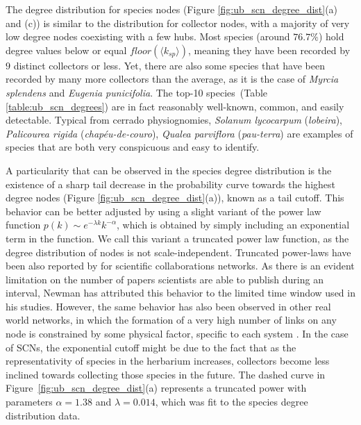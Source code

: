 The degree distribution for species nodes (Figure \ref{fig:ub_scn_degree_dist}(a) and (c)) is similar to the distribution for collector nodes, with a majority of very low degree nodes coexisting with a few hubs.
Most species (around $76.7\%$) hold degree values below or equal $floor(\langle k_{sp}\rangle)$, meaning they have been recorded by $9$ distinct collectors or less.
Yet, there are also some species that have been recorded by many more collectors than the average, as it is the case of \textit{Myrcia splendens} and \textit{Eugenia punicifolia}. The top-10 species~(Table \ref{table:ub_scn_degrees}) are in fact reasonably well-known, common, and easily detectable. Typical from cerrado physiognomies, \textit{Solanum lycocarpum} (\textit{lobeira}), \textit{Palicourea rigida} (\textit{chapéu-de-couro}), \textit{Qualea parviflora} (\textit{pau-terra}) are examples of species that are both very conspicuous and easy to identify.


A particularity that can be observed in the species degree distribution is the existence of a sharp tail decrease in the probability curve towards the highest degree nodes (Figure \ref{fig:ub_scn_degree_dist}(a)), known as a tail cutoff.
This behavior can be better adjusted by using a slight variant of the power law function $p(k) \sim e^{-\lambda k} k^{-\alpha}$, which is obtained by simply including an exponential term in the function. We call this variant a truncated power law function, as the degree distribution of nodes is not scale-independent.
Truncated power-laws have been also reported by  for scientific collaborations networks. 
As there is an evident limitation on the number of papers scientists are able to publish during an interval, Newman has attributed this behavior to the limited time window used in his studies. 
However, the same behavior has also been observed in other real world networks, in which the formation of a very high number of links on any node is constrained by some physical factor, specific to each system \cite{Albert2002}. 
In the case of SCNs, the exponential cutoff might be due to the fact that as the representativity of species in the herbarium increases, collectors become less inclined towards collecting those species in the future. 
The dashed curve in Figure~\ref{fig:ub_scn_degree_dist}(a) represents a truncated power with parameters $\alpha=1.38$ and $\lambda =0.014$, which was fit to the species degree distribution data.

